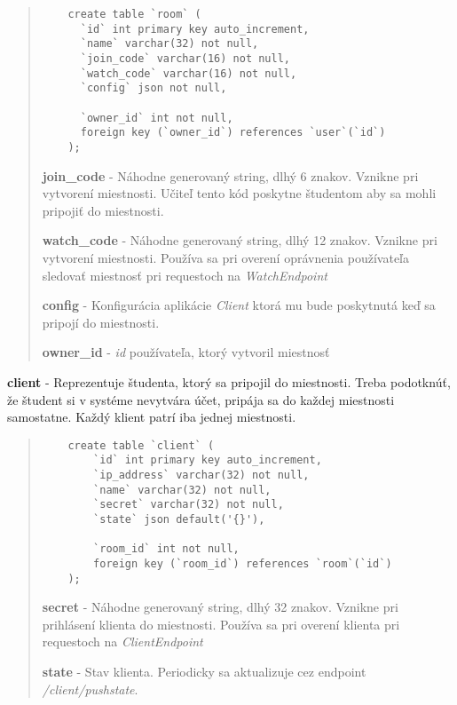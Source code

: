 \documentclass{article}
\newcommand{\filedesc}[1]{\vspace{0.3cm} \noindent \textbf{#1}}
\newcommand{\file}[1]{\emph{#1}}
\begin{document}
\begin{quote}
  
  \begin{verbatim}
    create table `room` (
      `id` int primary key auto_increment,
      `name` varchar(32) not null,
      `join_code` varchar(16) not null,
      `watch_code` varchar(16) not null,
      `config` json not null,

      `owner_id` int not null,
      foreign key (`owner_id`) references `user`(`id`)
    );
  \end{verbatim}

  \filedesc{join{\_}code} - Náhodne generovaný string, dlhý 6 znakov. Vznikne pri vytvorení miestnosti. Učiteľ tento kód poskytne študentom aby sa mohli pripojiť do miestnosti.

  \filedesc{watch{\_}code} - Náhodne generovaný string, dlhý 12 znakov. Vznikne pri vytvorení miestnosti. Používa sa pri overení oprávnenia používateľa sledovať miestnosť pri requestoch na \emph{WatchEndpoint}

  \filedesc{config} - Konfigurácia aplikácie \emph{Client} ktorá mu bude poskytnutá keď sa pripojí do miestnosti.
  
  \filedesc{owner{\_}id} - \emph{id} používateľa, ktorý vytvoril miestnosť

\end{quote}

\filedesc{client} - Reprezentuje študenta, ktorý sa pripojil do miestnosti. Treba podotknúť, že študent si v systéme nevytvára účet, pripája sa do každej miestnosti samostatne. Každý klient patrí iba jednej miestnosti.

\begin{quote}
  \begin{verbatim}
    create table `client` (
        `id` int primary key auto_increment,
        `ip_address` varchar(32) not null,
        `name` varchar(32) not null,
        `secret` varchar(32) not null,
        `state` json default('{}'),

        `room_id` int not null,
        foreign key (`room_id`) references `room`(`id`)
    );
  \end{verbatim}

  \filedesc{secret} - Náhodne generovaný string, dlhý 32 znakov. Vznikne pri prihlásení klienta do miestnosti. Používa sa pri overení klienta pri requestoch na \emph{ClientEndpoint}

  \filedesc{state} - Stav klienta. Periodicky sa aktualizuje cez endpoint \file{/client/pushstate}.

\end{quote}
\end{document}
